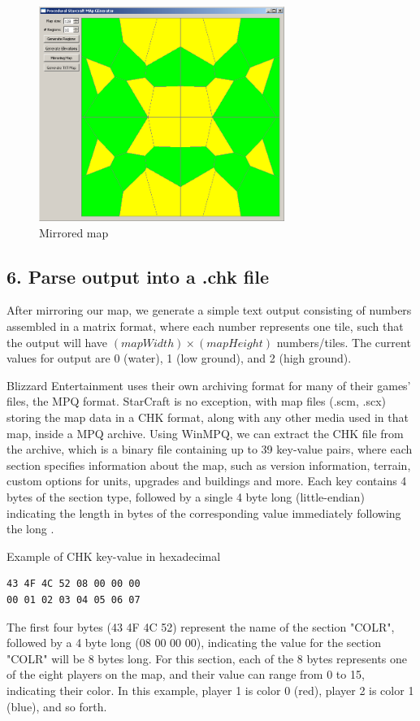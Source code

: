 \documentclass[letterpaper]{article}
\begin{document}
\begin{figure}[ht]
    \centering
    \includegraphics[width=8cm]{PCG04.png}
    \caption{Mirrored map}
    \label{fig:mirrored-map}
\end{figure}

\subsection{6. Parse output into a .chk file}
After mirroring our map, we generate a simple text output consisting of numbers assembled in a matrix format, where each number represents one tile, such that the output will have $(mapWidth) \times (mapHeight)$ numbers/tiles. The current values for output are 0 (water), 1 (low ground), and 2 (high ground).

Blizzard Entertainment uses their own archiving format for many of their games' files, the MPQ format. StarCraft is no exception, with map files (.scm, .scx) storing the map data in a CHK format, along with any other media used in that map, inside a MPQ archive. Using WinMPQ, we can extract the CHK file from the archive, which is a binary file containing up to 39 key-value pairs, where each section specifies information about the map, such as version information, terrain, custom options for units, upgrades and buildings and more. Each key contains 4 bytes of the section type, followed by a single 4 byte long (little-endian) indicating the length in bytes of the corresponding value immediately following the long \cite{Olbrantz}.

Example of CHK key-value in hexadecimal
\begin{verbatim}
43 4F 4C 52 08 00 00 00
00 01 02 03 04 05 06 07
\end{verbatim}

The first four bytes (43 4F 4C 52) represent the name of the section "COLR", followed by a 4 byte long (08 00 00 00), indicating the value for the section "COLR" will be 8 bytes long. For this section, each of the 8 bytes represents one of the eight players on the map, and their value can range from 0 to 15, indicating their color. In this example, player 1 is color 0 (red), player 2 is color 1 (blue), and so forth.
\end{document}
